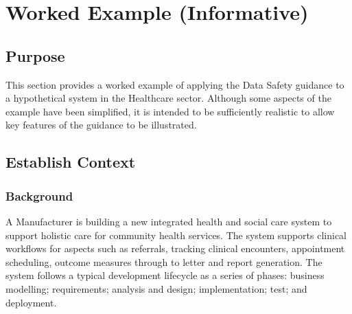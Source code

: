 %
%
\section{Worked Example (Informative)} \label{bkm:workedexample}


\subsection{Purpose}
This section provides a worked example of applying the Data Safety guidance to a hypothetical system in the Healthcare sector. Although some aspects of the example have been simplified, it is intended to be sufficiently realistic to allow key features of the guidance to be illustrated.

\subsection{Establish Context}

\subsubsection{Background}
A Manufacturer is building a new integrated health and social care system to support holistic care for community health services. The system supports clinical workflows for aspects such as referrals, tracking clinical encounters, appointment scheduling, outcome measures through to letter and report generation. The system follows a typical development lifecycle as a series of phases: business modelling; requirements; analysis and design; implementation; test; and deployment. 

